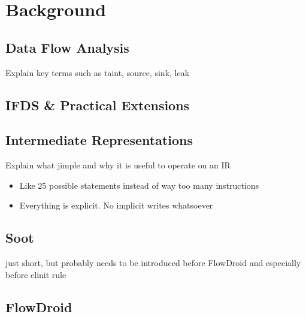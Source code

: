 \documentclass[../draft.tex]{subfiles}
\begin{document}
    \chapter{Background}
    \section{Data Flow Analysis}
    Explain key terms such as taint, source, sink, leak
    
    \section{IFDS \& Practical Extensions}
    
    
    \section{Intermediate Representations}\label{s:jimple}
    Explain what jimple and why it is useful to operate on an IR
    \begin{itemize}
        \item Like 25 possible statements instead of way too many instructions
        \item Everything is explicit. No implicit writes whatsoever
    \end{itemize}
    
    \section{Soot}
    just short, but probably needs to be introduced before FlowDroid and especially before clinit rule
    \section{FlowDroid}    
\end{document}
